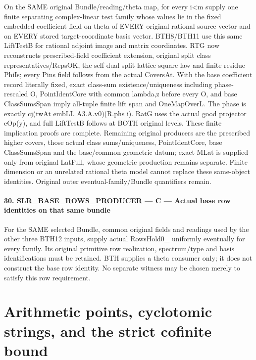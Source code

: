 \documentclass[11pt,a4paper]{article}
\numberwithin{equation}{section}
\theoremstyle{remark}\newtheorem{remark}[theorem]{Remark}
\begin{document}
On the SAME original Bundle/reading/theta map, for every i<m supply one finite separating complex-linear test family whose values lie in the fixed embedded coefficient field on theta of EVERY original rational source vector and on EVERY stored target-coordinate basis vector. BTH8/BTH11 use this same LiftTestB for rational adjoint image and matrix coordinates. RTG now reconstructs prescribed-field coefficient extension, original split class representatives/RepsOK, the self-dual split-lattice square law and finite residue PhiIs; every Pins field follows from the actual CoversAt. With the base coefficient record literally fixed, exact class-sum existence/uniqueness including phase-rescaled O, PointIdentCore with common lambda,z before every O, and base ClassSumsSpan imply all-tuple finite lift span and OneMapOverL. The phase is exactly cj(twAt embLL A3.A.v0)(R.phs i). RatG uses the actual good projector eOp(y), and full LiftTestB follows at BOTH original levels. These finite implication proofs are complete. Remaining original producers are the prescribed higher covers, those actual class sums/uniqueness, PointIdentCore, base ClassSumsSpan and the base/common geometric datum; exact MLat is supplied only from original LatFull, whose geometric production remains separate. Finite dimension or an unrelated rational theta model cannot replace these same-object identities. Original outer eventual-family/Bundle quantifiers remain.



\paragraph{30. SLR\_\allowbreak BASE\_\allowbreak ROWS\_\allowbreak PRODUCER — C — Actual base row identities on that same bundle}

For the SAME selected Bundle, common original fields and readings used by the other three BTH12 inputs, supply actual RowsHold0\_ uniformly eventually for every family. Its original primitive row realization, spectrum/type and basis identifications must be retained. BTH supplies a theta consumer only; it does not construct the base row identity. No separate witness may be chosen merely to satisfy this row requirement.



\clearpage
\section{Arithmetic points, cyclotomic strings, and the strict cofinite bound}
\label{sec:hida-decomposition-v45}
\end{document}
